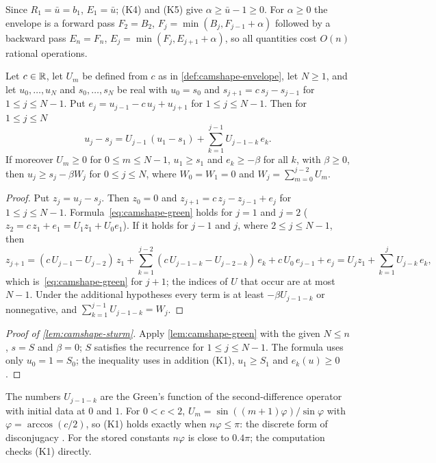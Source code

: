 Since $R_1 = \bar u = b_1$, $E_1 = \bar u$; (K4) and (K5) give $\alpha \ge \bar u - 1 \ge 0$.
For $\alpha \ge 0$ the envelope is a forward pass $F_2 = B_2$, $F_j = \min(B_j, F_{j-1} + \alpha)$ followed by a backward pass $E_n = F_n$, $E_j = \min(F_j, E_{j+1} + \alpha)$, so all quantities cost $O(n)$ rational operations.

\begin{lemma}\label{lem:camshape-green}
Let $c \in \mathbb{R}$, let $U_m$ be defined from $c$ as in \cref{def:camshape-envelope}, let $N \ge 1$, and let $u_0,\dots,u_N$ and $s_0,\dots,s_N$ be real with $u_0 = s_0$ and $s_{j+1} = c\,s_j - s_{j-1}$ for $1 \le j \le N-1$.
Put $e_j = u_{j-1} - c\,u_j + u_{j+1}$ for $1 \le j \le N-1$.
Then for $1 \le j \le N$
\begin{equation}\label{eq:camshape-green}
u_j - s_j = U_{j-1}\,(u_1 - s_1) + \sum_{k=1}^{j-1} U_{j-1-k}\, e_k .
\end{equation}
If moreover $U_m \ge 0$ for $0 \le m \le N-1$, $u_1 \ge s_1$ and $e_k \ge -\beta$ for all $k$, with $\beta \ge 0$, then $u_j \ge s_j - \beta W_j$ for $0 \le j \le N$, where $W_0 = W_1 = 0$ and $W_j = \sum_{m=0}^{j-2} U_m$.
\end{lemma}

\begin{proof}
Put $z_j = u_j - s_j$.
Then $z_0 = 0$ and $z_{j+1} = c\,z_j - z_{j-1} + e_j$ for $1 \le j \le N-1$.
Formula~\eqref{eq:camshape-green} holds for $j = 1$ and $j = 2$ ($z_2 = c\,z_1 + e_1 = U_1 z_1 + U_0 e_1$).
If it holds for $j-1$ and $j$, where $2 \le j \le N-1$, then
\[
z_{j+1} = (c\,U_{j-1} - U_{j-2})\,z_1 + \sum_{k=1}^{j-2}(c\,U_{j-1-k} - U_{j-2-k})\,e_k + c\,U_0\,e_{j-1} + e_j = U_j z_1 + \sum_{k=1}^{j} U_{j-k}\,e_k ,
\]
which is~\eqref{eq:camshape-green} for $j+1$; the indices of $U$ that occur are at most $N-1$.
Under the additional hypotheses every term is at least $-\beta U_{j-1-k}$ or nonnegative, and $\sum_{k=1}^{j-1}U_{j-1-k} = W_j$.
\end{proof}

\begin{proof}[Proof of \cref{lem:camshape-sturm}]
Apply \cref{lem:camshape-green} with the given $N \le n$, $s = S$ and $\beta = 0$; $S$ satisfies the recurrence for $1 \le j \le N-1$.
The formula uses only $u_0 = 1 = S_0$; the inequality uses in addition (K1), $u_1 \ge S_1$ and $e_k(u) \ge 0$.
\end{proof}

The numbers $U_{j-1-k}$ are the Green's function of the second-difference operator with initial data at $0$ and $1$.
For $0 < c < 2$, $U_m = \sin((m+1)\varphi)/\sin\varphi$ with $\varphi = \arccos(c/2)$, so (K1) holds exactly when $n\varphi \le \pi$: the discrete form of disconjugacy \citep[see][for the discrete Sturm--Liouville theory]{bohner1996-linear-hamiltonian-difference-systems-disconjugacy}.
For the stored constants $n\varphi$ is close to $0.4\pi$; the computation checks (K1) directly.

